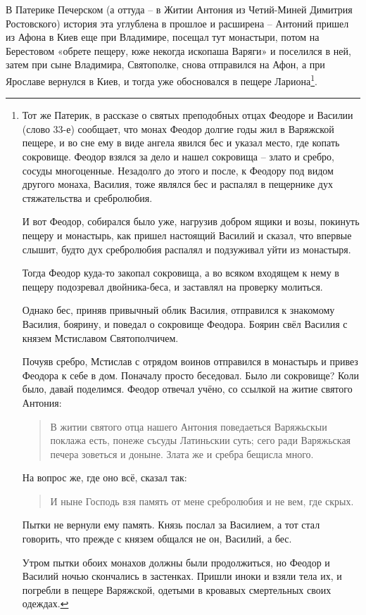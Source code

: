 \documentclass[a5paper,11pt,openany]{article}
\begin{document}
В Патерике Печерском (а оттуда – в Житии Антония из Четий-Миней Димитрия Ростовского) история эта углублена в прошлое и расширена – Антоний пришел из Афона в Киев еще при Владимире, посещал тут монастыри, потом на Берестовом «обрете пещеру, юже некогда ископаша Варяги» и поселился в ней, затем при сыне Владимира, Святополке, снова отправился на Афон, а при Ярославе вернулся в Киев, и тогда уже обосновался в пещере Лариона\footnote{Тот же Патерик, в рассказе о святых преподобных отцах Феодоре и Василии (слово 33-е) сообщает, что монах Феодор долгие годы жил в Варяжской пещере, и во сне ему в виде ангела явился бес и указал место, где копать сокровище. Феодор взялся за дело и нашел сокровища – злато и сребро, сосуды многоценные. Незадолго до этого и после, к Феодору под видом другого монаха, Василия, тоже являлся бес и распалял в пещернике дух стяжательства и сребролюбия. 

И вот Феодор, собирался было уже, нагрузив добром ящики и возы, покинуть пещеру и монастырь, как пришел настоящий Василий и сказал, что впервые слышит, будто дух сребролюбия распалял и подзуживал уйти из монастыря.

Тогда Феодор куда-то закопал сокровища, а во всяком входящем к нему в пещеру подозревал двойника-беса, и заставлял на проверку молиться.

Однако бес, приняв привычный облик Василия, отправился к знакомому Василия, боярину, и поведал о сокровище Феодора. Боярин свёл Василия с князем Мстиславом Святополчичем.

Почуяв сребро, Мстислав с отрядом воинов отправился в монастырь и привез Феодора к себе в дом. Поначалу просто беседовал. Было ли сокровище? Коли было, давай поделимся. Феодор отвечал учёно, со ссылкой на житие святого Антония:

\begin{quotation}
\noindent В житии святого отца нашего Антония поведаеться Варяжьскыи поклажа есть, понеже съсуды Латиньскии суть; сего ради Варяжьская печера зоветься и доныне. Злата же и сребра бещисла много.
\end{quotation}

На вопрос же, где оно всё, сказал так:

\begin{quotation}
\noindent И ныне Господь взя память от мене сребролюбия и не вем, где скрых.
\end{quotation}

Пытки не вернули ему память. Князь послал за Василием, а тот стал говорить, что прежде с князем общался не он, Василий, а бес. 

Утром пытки обоих монахов должны были продолжиться, но Феодор и Василий ночью скончались в застенках. Пришли иноки и взяли тела их, и погребли в пещере Варяжской, одетыми в кровавых смертельных своих одеждах.}.
\end{document}

